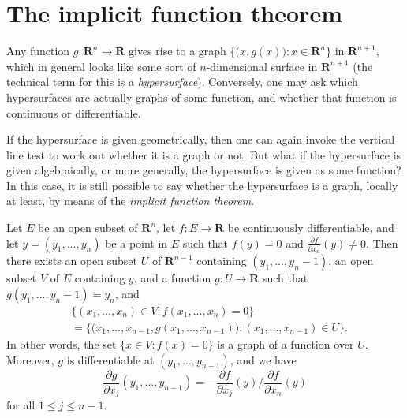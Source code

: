 \section{The implicit function theorem}\label{sec 6.8}

\begin{note}
    Any function \(g : \mathbf{R}^n \to \mathbf{R}\) gives rise to a graph \(\Big\{\big(x, g(x)\big) : x \in \mathbf{R}^n\Big\}\) in \(\mathbf{R}^{n + 1}\), which in general looks like some sort of \(n\)-dimensional surface in \(\mathbf{R}^{n + 1}\)
    (the technical term for this is a \emph{hypersurface}).
    Conversely, one may ask which hypersurfaces are actually graphs of some function, and whether that function is continuous or differentiable.
\end{note}

\begin{note}
    If the hypersurface is given geometrically, then one can again invoke the vertical line test to work out whether it is a graph or not.
    But what if the hypersurface is given algebraically, or more generally, the hypersurface is given as some function?
    In this case, it is still possible to say whether the hypersurface is a graph, locally at least, by means of the \emph{implicit function theorem}.
\end{note}

\begin{theorem}\label{6.8.1}
    Let \(E\) be an open subset of \(\mathbf{R}^n\), let \(f : E \to \mathbf{R}\) be continuously differentiable, and let \(y = (y_1, \dots, y_n)\) be a point in \(E\) such that \(f(y) = 0\) and \(\frac{\partial f}{\partial x_n}(y) \neq 0\).
    Then there exists an open subset \(U\) of \(\mathbf{R}^{n - 1}\) containing \((y_1, \dots, y_n - 1)\), an open subset \(V\) of \(E\) containing \(y\), and a function \(g : U \to \mathbf{R}\) such that \(g(y_1, \dots, y_n - 1) = y_n\), and
    \begin{align*}
         & \{(x_1, \dots, x_n) \in V : f(x_1, \dots, x_n) = 0\}                                                     \\
         & = \Big\{\big(x_1, \dots, x_{n - 1}, g(x_1, \dots, x_{n - 1})\big) : (x_1, \dots, x_{n - 1}) \in U\Big\}.
    \end{align*}
    In other words, the set \(\{x \in V : f(x) = 0\}\) is a graph of a function over \(U\).
    Moreover, \(g\) is differentiable at \((y_1, \dots, y_{n - 1})\), and we have
    \[
        \frac{\partial g}{\partial x_j}(y_1, \dots, y_{n - 1}) = -\frac{\partial f}{\partial x_j}(y) / \frac{\partial f}{\partial x_n}(y) \tag{6.1}\label{eq 6.1}
    \]
    for all \(1 \leq j \leq n - 1\).
\end{theorem}


